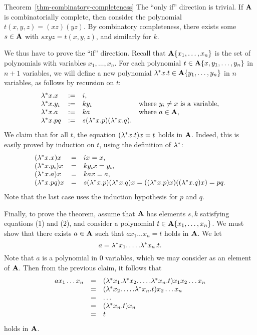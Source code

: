\documentclass{article}
\begin{document}
\begin{proofof}{Theorem~\ref{thm-combinatory-completeness}}
  The ``only if'' direction is trivial. If ${\bf A}$ is combinatorially
  complete, then consider the polynomial $t(x,y,z)=(xz)(yz)$. By
  combinatory completeness, there exists some $s\in{\bf A}$ with
  $sxyz=t(x,y,z)$, and similarly for $k$.
  
  We thus have to prove the ``if'' direction.  Recall that
  ${\bf A}\{x_1,\ldots,x_n\}$ is the set of polynomials with variables
  $x_1,\ldots,x_n$. For each polynomial $t\in{\bf A}\{x,y_1,\ldots,y_n\}$ in
  $n+1$ variables, we will define a new polynomial $\lambda^*x.t \in
  {\bf A}\{y_1,\ldots,y_n\}$ in $n$ variables, as follows by recursion on
  $t$:
  \[ \begin{array}{llll}
    \lambda^*x.x &:=& i,\\
    \lambda^*x.y_i &:=& ky_i & \mbox{where $y_i\neq x$ is a variable,} \\
    \lambda^*x.a &:=& ka     & \mbox{where $a\in {\bf A}$,}\\
    \lambda^*x.pq &:=& s(\lambda^*x.p)(\lambda^*x.q). \\
  \end{array}
  \]
  We claim that for all $t$, the equation $(\lambda^* x.t)x = t$ holds
  in ${\bf A}$. Indeed, this is easily proved by induction on $t$, using
  the definition of $\lambda^*$:
  \[ \begin{array}{llll}
    (\lambda^*x.x)x &=& ix = x,\\
    (\lambda^*x.y_i)x &=& ky_ix = y_i,\\
    (\lambda^*x.a)x &=& kax = a,\\
    (\lambda^*x.pq)x &=& s(\lambda^*x.p)(\lambda^*x.q)x = ((\lambda^*x.p)x)((\lambda^*x.q)x) = pq. \\
  \end{array}
  \]
  Note that the last case uses the induction hypothesis for $p$ and $q$. 
  
  Finally, to prove the theorem, assume that ${\bf A}$ has elements $s,k$
  satisfying equations (1) and (2), and consider a polynomial
  $t\in{\bf A}\{x_1,\ldots,x_n\}$. We must show that there exists $a\in{\bf A}$
  such that $ax_1\ldots x_n = t$ holds in ${\bf A}$. We let
  \[ a = \lambda^*x_1.\ldots.\lambda^*x_n.t.
  \]
  Note that $a$ is a polynomial in $0$ variables, which we may
  consider as an element of ${\bf A}$. Then from the previous claim, it
  follows that
  \[ \begin{array}{lll}
    ax_1\ldots x_n &=& (\lambda^*x_1.\lambda^*x_2.\ldots.\lambda^*x_n.t)x_1x_2\ldots x_n\\
    &=& (\lambda^*x_2.\ldots.\lambda^*x_n.t)x_2\ldots x_n\\
    &=& \ldots\\
    &=& (\lambda^*x_n.t)x_n\\
    &=& t\\
  \end{array}
  \]
  holds in ${\bf A}$. \eot
\end{proofof}
\end{document}
